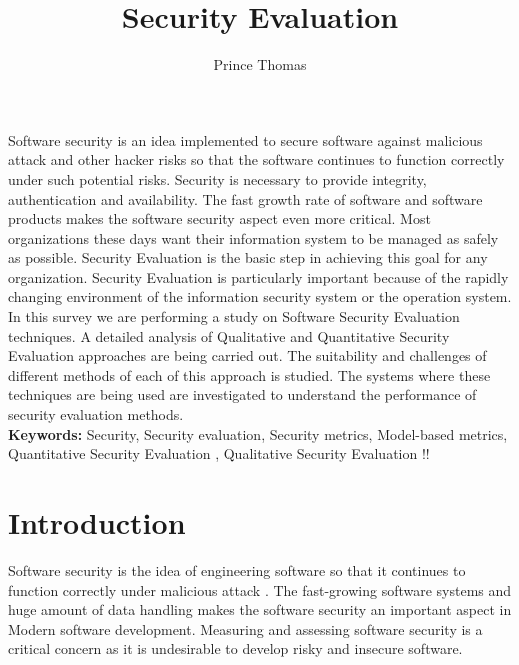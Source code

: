 \documentclass[pdftex,english,oribibl]{llncs}
\title{Security Evaluation}
\author{Prince Thomas}
\institute{University of Stuttgart\\Institute of Software Technology (ISTE)\\70569 Stuttgart, Germany}
\makeatletter
\gdef\@keywords{}
\renewenvironment{abstract}{%
  \list{}{\advance\topsep by0.35cm\relax\small%
          \leftmargin=1cm%
          \labelwidth=\z@%
          \listparindent=\z@%
          \itemindent\listparindent%
          \rightmargin\leftmargin}%
          \item[\hskip\labelsep\bfseries\abstractname]}{%
  \if!\@keywords!\else{\item[~]\item[\hskip\labelsep\bfseries\keywordname]\@keywords}\fi%
  \endlist}
\makeatother
\begin{document}
\maketitle

\begin{abstract}
Software security is an idea implemented to secure software against malicious attack and other hacker risks so that the software continues to function correctly under such potential risks. Security is necessary to provide integrity, authentication and availability. The fast growth rate of software and software products makes the software security aspect even more critical. Most organizations these days want their information system to be managed as safely as possible. Security Evaluation is the basic step in achieving this goal for any organization. Security Evaluation is particularly important because of the rapidly changing environment of the information security system or the operation system. In this survey we are performing a study on Software Security Evaluation techniques. A detailed analysis of Qualitative and Quantitative Security Evaluation approaches are being carried out. The suitability and challenges of different methods of each of this approach is studied. The systems where these techniques are being used are investigated to understand the performance of security evaluation methods.\\

\textbf{Keywords:} Security, Security evaluation, Security metrics, Model-based metrics, Quantitative Security Evaluation , Qualitative Security Evaluation
\end{abstract}


\section{Introduction}

  Software security is the idea of engineering software so that it continues to function correctly under malicious attack \cite{1281254_McGraw}. The fast-growing software systems and huge amount of data handling makes the software security an important aspect in Modern software development. Measuring and assessing software security is a critical concern as it is undesirable to develop risky and insecure software. 
  
\end{document}
